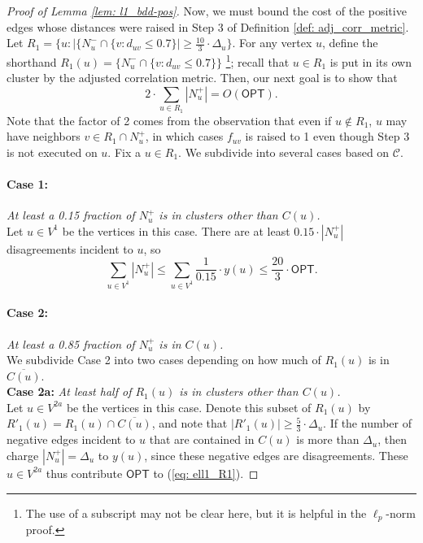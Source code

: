 \begin{proof}[Proof of Lemma \ref{lem: l1_bdd-pos}]
Now, we must bound the cost of the positive edges whose distances were raised in Step 3 of Definition \ref{def: adj_corr_metric}. 
Let $R_1 = \{u : \vert\{N_u^- \cap \{v: d_{uv} \leq 0.7\}\vert \geq \frac{10}{3}\cdot \Delta_u\}$.
For any vertex $u$, define the shorthand $R_1(u) = \{N_u^- \cap \{v: d_{uv} \leq 0.7\}\}$
\footnote{The use of a subscript may not be clear here, but it is helpful in the $\ell_p$-norm proof.}; 
recall that $u \in R_1$ is put in its own cluster by the adjusted correlation metric.
Then, our next goal is to show that
\begin{equation} \label{eq: ell1_R1}
2 \cdot \sum_{u \in R_1} |N_u^+| = O(\textsf{OPT}).
\end{equation}
Note that the factor of 2 comes from the observation that even if $u \not \in R_1$, $u$ may have neighbors $v \in R_1 \cap N_u^+$, in which cases $f_{uv}$ is raised to 1 even though Step 3 is not executed on $u$. Fix a $u \in R_1$.
We subdivide into several cases based on $\mathcal{C}$.

\paragraph{Case 1: }\emph{At least a 0.15 fraction of $N_u^+$ is in clusters other than $C(u)$.} \\
Let $ u \in V^{1}$ be the vertices in this case.
There are at least $0.15\cdot |N_u^+|$ disagreements incident to $u$, so 
$$\boxed{\sum_{u \in V^1} |N_u^+| \leq \sum_{u \in V^1} \frac{1}{0.15} \cdot y(u) \leq \frac{20}{3}\cdot \textsf{OPT}.}$$

\paragraph{Case 2: }\emph{At least a 0.85 fraction of $N_u^+$ is in $C(u)$.} \\
We subdivide Case 2 into two cases depending on how much 
of $R_1(u)$ is in $\overline{C(u)}$.\\

\noindent \textbf{Case 2a:} \emph{At least half of $R_1(u)$ is in clusters other than $C(u)$.} \\
Let $ u \in  V^{2a}$ be the vertices in this case.
Denote this subset of $R_1(u)$ by $R'_1(u) = R_1(u) \cap \overline{C(u)}$, and note that $|R'_1(u)| \geq \frac{5}{3}\cdot \Delta_u$. If the number of negative edges incident to $u$ that are contained in $C(u)$ is more than $\Delta_u$, then charge $|N_u^+| = \Delta_u$ to $y(u)$, since these negative edges are disagreements. These $u \in V^{2a}$ thus contribute $\textsf{OPT}$ to (\ref{eq: ell1_R1}). 


\end{proof}
